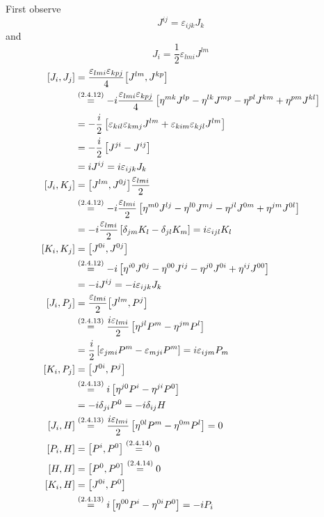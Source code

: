 \subsubsection{ }
First observe \[J^{ij}=\varepsilon_{ijk}J_k\]
and \[J_i=\dfrac{1}{2}\varepsilon_{lmi}J^{lm}\]
\begin{align*} 
	\commutator{J_i}{J_j}&=\dfrac{\varepsilon_{lmi}\varepsilon_{kpj}}{4}\commutator{J^{lm}}{J^{kp}}\\
	&\overset{\eqc{2.4.12}}{=}-i\dfrac{\varepsilon_{lmi}\varepsilon_{kpj}}{4}\left[\eta^{mk}J^{lp}-\eta^{lk}J^{mp}-\eta^{pl}J^{km}+\eta^{pm}J^{kl}\right]\\
	&=-\dfrac{i}{2}\left[\varepsilon_{kil}\varepsilon_{kmj}J^{lm}+\varepsilon_{kim}\varepsilon_{kjl}J^{lm}\right]\\
	&=-\dfrac{i}{2}\left[J^{ji}-J^{ij}\right]\\
	&=iJ^{ij}=i\varepsilon_{ijk}J_k\\
	\commutator{J_i}{K_j}&=\commutator{J^{lm}}{J^{0j}}\dfrac{\varepsilon_{lmi}}{2}\\
	&\overset{\eqc{2.4.12}}{=}-i\dfrac{\varepsilon_{lmi}}{2}\left[\eta^{m0}J^{lj}-\eta^{l0}J^{mj}-\eta^{jl}J^{0m}+\eta^{jm}J^{0l}\right]\\
	&=-i\dfrac{\varepsilon_{lmi}}{2}\left[\delta_{jm} K_l-\delta_{jl}K_m\right]=i\varepsilon_{ijl}K_l\\
	\commutator{K_i}{K_j}&=\commutator{J^{0i}}{J^{0j}}\\
	&\overset{\eqc{2.4.12}}{=}-i\left[\eta^{i0}J^{0j}-\eta^{00}J^{ij}-\eta^{j0}J^{0i}+\eta^{ij}J^{00}\right]\\
	&=-iJ^{ij}=-i\varepsilon_{ijk}J_k\\
	\comm{J_i}{P_j}&=\dfrac{\varepsilon_{lmi}}{2}\comm{J^{lm}}{P^{j}}\\
	&\overset{\eqc{2.4.13}}{=}\dfrac{i\varepsilon_{lmi}}{2}\left[\eta^{jl}P^m-\eta^{jm}P^l\right]\\
	&=\dfrac{i}{2}\left[\varepsilon_{jmi}P^m-\varepsilon_{mji}P^m\right]=i\varepsilon_{ijm}P_m\\
	\commutator{K_i}{P_j}&=\commutator{J^{0i}}{P^{j}}\\
	&\overset{\eqc{2.4.13}}{=}i\left[\eta^{j0}P^i-\eta^{ji}P^0\right]\\
	&=-i\delta_{ji}P^0=-i\delta_{ij}H\\
	\comm{J_i}{H}&\overset{\eqc{2.4.13}}{=}\dfrac{i\varepsilon_{lmi}}{2}\left[\eta^{0l}P^m-\eta^{0m}P^l\right]=0\\
	\comm{P_i}{H}&=\commutator{P^i}{P^0}\overset{\eqc{2.4.14}}{=}0\\
	\comm{H}{H}&=\commutator{P^0}{P^0}\overset{\eqc{2.4.14}}{=}0	\\
	\commutator{K_i}{H}&=\commutator{J^{0i}}{P^{0}}\\
	&\overset{\eqc{2.4.13}}{=}i\left[\eta^{00}P^i-\eta^{0i}P^0\right]=-i P_i
\end{align*}

